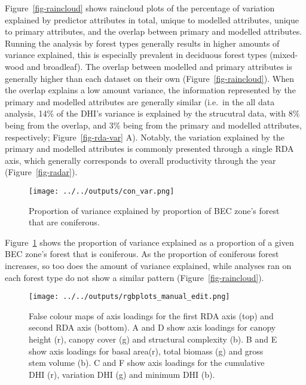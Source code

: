 \documentclass[
  authoryear,
  review,
  3p,
  twocolumn]{elsarticle}
\begin{document}
Figure~\ref{fig-raincloud} shows raincloud plots of the percentage of
variation explained by predictor attributes in total, unique to modelled
attributes, unique to primary attributes, and the overlap between
primary and modelled attributes. Running the analysis by forest types
generally results in higher amounts of variance explained, this is
especially prevalent in deciduous forest types (mixed-wood and
broadleaf). The overlap between modelled and primary attributes is
generally higher than each dataset on their own
(Figure~\ref{fig-raincloud}). When the overlap explains a low amount
variance, the information represented by the primary and modelled
attributes are generally similar (i.e.~in the all data analysis, 14\% of
the DHI's variance is explained by the strucutral data, with 8\% being
from the overlap, and 3\% being from the primary and modelled
attributes, respectively; Figure~\ref{fig-rda-var} A). Notably, the
variation explained by the primary and modelled attributes is commonly
presented through a single RDA axis, which generally corresponds to
overall productivity through the year (Figure~\ref{fig-radar}).

\begin{figure}

{\centering \texttt{[image: ../../outputs/con\_var.png]}

}

\caption{\label{fig-con-var}Proportion of variance explained by
proportion of BEC zone's forest that are coniferous.}

\end{figure}

Figure~\ref{fig-con-var} shows the proportion of variance explained as a
proportion of a given BEC zone's forest that is coniferous. As the
proportion of coniferous forest increases, so too does the amount of
variance explained, while analyses ran on each forest type do not show a
similar pattern (Figure~\ref{fig-raincloud}).

\begin{figure}

{\centering \texttt{[image: ../../outputs/rgbplots\_manual\_edit.png]}

}

\caption{\label{fig-fcc}False colour maps of axis loadings for the first
RDA axis (top) and second RDA axis (bottom). A and D show axis loadings
for canopy height (r), canopy cover (g) and structural complexity (b). B
and E show axis loadings for basal area(r), total biomass (g) and gross
stem volume (b). C and F show axis loadings for the cumulative DHI (r),
variation DHI (g) and minimum DHI (b).}

\end{figure}
\end{document}
